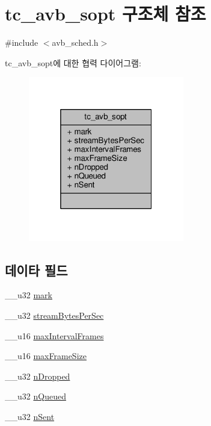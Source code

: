 \hypertarget{structtc__avb__sopt}{}\section{tc\+\_\+avb\+\_\+sopt 구조체 참조}
\label{structtc__avb__sopt}


{\ttfamily \#include $<$avb\+\_\+sched.\+h$>$}



tc\+\_\+avb\+\_\+sopt에 대한 협력 다이어그램\+:
\nopagebreak
\begin{figure}[H]
\begin{center}
\leavevmode
\includegraphics[width=193pt]{structtc__avb__sopt__coll__graph}
\end{center}
\end{figure}
\subsection*{데이타 필드}
\begin{DoxyCompactItemize}
\item 
\+\_\+\+\_\+u32 \hyperlink{structtc__avb__sopt_ab6c7e307fa0c23b24f307864779bcbd1}{mark}
\item 
\+\_\+\+\_\+u32 \hyperlink{structtc__avb__sopt_ab6397ebcd88d6d7dbb661a94bd248894}{stream\+Bytes\+Per\+Sec}
\item 
\+\_\+\+\_\+u16 \hyperlink{structtc__avb__sopt_a6acc52cd56f8f2c216d8069d6e54a158}{max\+Interval\+Frames}
\item 
\+\_\+\+\_\+u16 \hyperlink{structtc__avb__sopt_ad7df0d5cafcfc25ac44005b19575f04e}{max\+Frame\+Size}
\item 
\+\_\+\+\_\+u32 \hyperlink{structtc__avb__sopt_a55fc6074022d98844a289c91c5d5e429}{n\+Dropped}
\item 
\+\_\+\+\_\+u32 \hyperlink{structtc__avb__sopt_ae5bbd9d9c91d96bddeb63b225c76cda3}{n\+Queued}
\item 
\+\_\+\+\_\+u32 \hyperlink{structtc__avb__sopt_ab6313c3491e913dca3d52031097a17e1}{n\+Sent}
\end{DoxyCompactItemize}


